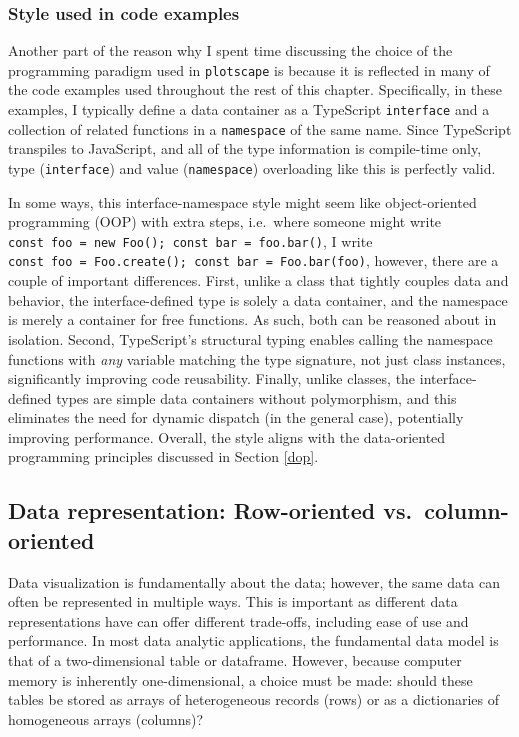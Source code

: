 \documentclass[
  openany]{book}
\theoremstyle{definition}
\theoremstyle{definition}
\theoremstyle{definition}
\theoremstyle{definition}
\theoremstyle{remark}
\begin{document}
\subsubsection{Style used in code examples}\label{style-used-in-code-examples}

Another part of the reason why I spent time discussing the choice of the programming paradigm used in \texttt{plotscape} is because it is reflected in many of the code examples used throughout the rest of this chapter. Specifically, in these examples, I typically define a data container as a TypeScript \texttt{interface} and a collection of related functions in a \texttt{namespace} of the same name. Since TypeScript transpiles to JavaScript, and all of the type information is compile-time only, type (\texttt{interface}) and value (\texttt{namespace}) overloading like this is perfectly valid.

In some ways, this interface-namespace style might seem like object-oriented programming (OOP) with extra steps, i.e.~where someone might write \texttt{const\ foo\ =\ new\ Foo();\ const\ bar\ =\ foo.bar()}, I write \texttt{const\ foo\ =\ Foo.create();\ const\ bar\ =\ Foo.bar(foo)}, however, there are a couple of important differences. First, unlike a class that tightly couples data and behavior, the interface-defined type is solely a data container, and the namespace is merely a container for free functions. As such, both can be reasoned about in isolation. Second, TypeScript's structural typing enables calling the namespace functions with \emph{any} variable matching the type signature, not just class instances, significantly improving code reusability. Finally, unlike classes, the interface-defined types are simple data containers without polymorphism, and this eliminates the need for dynamic dispatch (in the general case), potentially improving performance. Overall, the style aligns with the data-oriented programming principles discussed in Section \ref{dop}.

\subsection{Data representation: Row-oriented vs.~column-oriented}\label{row-column}

Data visualization is fundamentally about the data; however, the same data can often be represented in multiple ways. This is important as different data representations have can offer different trade-offs, including ease of use and performance. In most data analytic applications, the fundamental data model is that of a two-dimensional table or dataframe. However, because computer memory is inherently one-dimensional, a choice must be made: should these tables be stored as arrays of heterogeneous records (rows) or as a dictionaries of homogeneous arrays (columns)?
\end{document}
